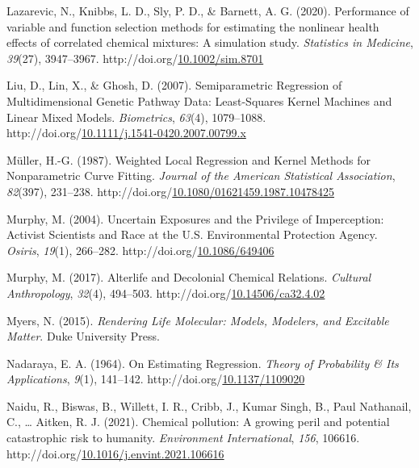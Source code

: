 \documentclass[12pt, twoside]{amherstthesis}
\newenvironment{CSLReferences}[2]%
  {}%
  {\par}
\begin{document}
\begin{CSLReferences}{1}{0}
\leavevmode{}%
Lazarevic, N., Knibbs, L. D., Sly, P. D., \& Barnett, A. G. (2020). Performance of variable and function selection methods for estimating the nonlinear health effects of correlated chemical mixtures: {A} simulation study. \emph{Statistics in Medicine}, \emph{39}(27), 3947--3967. http://doi.org/\href{https://doi.org/10.1002/sim.8701}{10.1002/sim.8701}

\leavevmode{}%
Liu, D., Lin, X., \& Ghosh, D. (2007). Semiparametric {Regression} of {Multidimensional} {Genetic} {Pathway} {Data}: {Least}-{Squares} {Kernel} {Machines} and {Linear} {Mixed} {Models}. \emph{Biometrics}, \emph{63}(4), 1079--1088. http://doi.org/\href{https://doi.org/10.1111/j.1541-0420.2007.00799.x}{10.1111/j.1541-0420.2007.00799.x}

\leavevmode{}%
Müller, H.-G. (1987). Weighted {Local} {Regression} and {Kernel} {Methods} for {Nonparametric} {Curve} {Fitting}. \emph{Journal of the American Statistical Association}, \emph{82}(397), 231--238. http://doi.org/\href{https://doi.org/10.1080/01621459.1987.10478425}{10.1080/01621459.1987.10478425}

\leavevmode{}%
Murphy, M. (2004). Uncertain {Exposures} and the {Privilege} of {Imperception}: {Activist} {Scientists} and {Race} at the {U}.{S}. {Environmental} {Protection} {Agency}. \emph{Osiris}, \emph{19}(1), 266--282. http://doi.org/\href{https://doi.org/10.1086/649406}{10.1086/649406}

\leavevmode{}%
Murphy, M. (2017). Alterlife and {Decolonial} {Chemical} {Relations}. \emph{Cultural Anthropology}, \emph{32}(4), 494--503. http://doi.org/\href{https://doi.org/10.14506/ca32.4.02}{10.14506/ca32.4.02}

\leavevmode{}%
Myers, N. (2015). \emph{Rendering {Life} {Molecular}: {Models}, {Modelers}, and {Excitable} {Matter}}. Duke University Press.

\leavevmode{}%
Nadaraya, E. A. (1964). On {Estimating} {Regression}. \emph{Theory of Probability \& Its Applications}, \emph{9}(1), 141--142. http://doi.org/\href{https://doi.org/10.1137/1109020}{10.1137/1109020}

\leavevmode{}%
Naidu, R., Biswas, B., Willett, I. R., Cribb, J., Kumar Singh, B., Paul Nathanail, C., \ldots{} Aitken, R. J. (2021). Chemical pollution: {A} growing peril and potential catastrophic risk to humanity. \emph{Environment International}, \emph{156}, 106616. http://doi.org/\href{https://doi.org/10.1016/j.envint.2021.106616}{10.1016/j.envint.2021.106616}


\end{CSLReferences}
\end{document}
